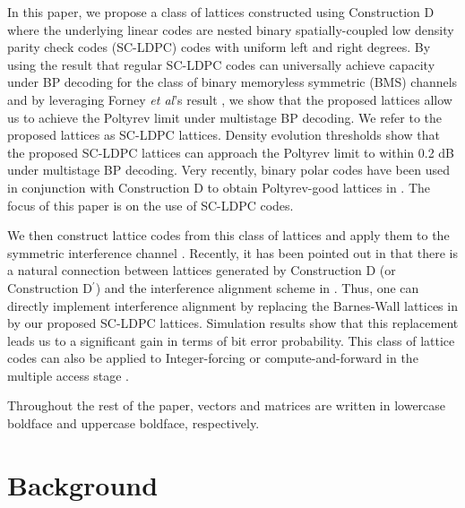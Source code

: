 \documentclass[journal]{IEEEtran}
\begin{document}
In this paper, we propose a class of lattices constructed using Construction D \cite{BarnesSloane83} where the underlying linear codes are nested binary spatially-coupled low density parity check codes (SC-LDPC) codes with uniform left and right degrees. By using the result that regular SC-LDPC codes can universally achieve capacity under BP decoding for the class of binary memoryless symmetric (BMS) channels  \cite{kudekaruniversal,kumar2013pfister} and by leveraging Forney {\em et al}'s result \cite{forney2000}, we show that the proposed lattices allow us to achieve the Poltyrev
limit under multistage BP decoding. We refer to the proposed lattices as SC-LDPC lattices. Density evolution thresholds show that the proposed SC-LDPC lattices can approach the Poltyrev limit to within 0.2 dB under multistage BP decoding. Very recently, binary polar codes have been used in conjunction with Construction D to obtain Poltyrev-good lattices in \cite{YanLingWu13}. The focus of this paper is on the use of SC-LDPC codes.

We then construct lattice codes from this class of lattices and apply them to the symmetric interference channel \cite{jafar10}.  Recently, it has been pointed out in \cite{Estela13} that there is a natural connection between lattices generated by Construction D (or Construction D$^\prime$) and the interference alignment scheme in \cite{jafar10}. Thus, one can directly implement interference alignment by replacing the
Barnes-Wall lattices in \cite{Estela13} by our proposed SC-LDPC lattices. Simulation results show that this replacement
leads us to a significant gain in terms of bit error probability. This class of lattice codes can also be applied to Integer-forcing or compute-and-forward in the multiple access stage \cite{nazer2011CF}.

Throughout the rest of the paper, vectors and matrices are written in lowercase boldface and uppercase boldface, respectively.

\section{Background}
\label{Section:Background}
\end{document}
